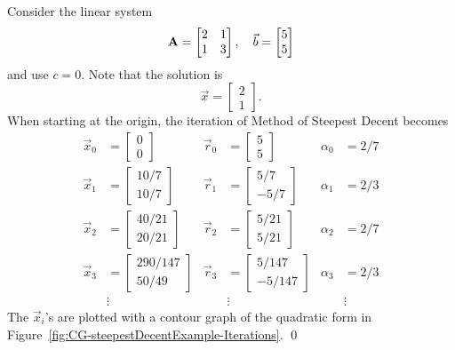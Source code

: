 \begin{example}
\label{ex:CG-SteepestDecent}
Consider the linear system
\[
	\mathbf{A} = \begin{bmatrix}
		2 & 1 \\
		1 & 3
	\end{bmatrix},
	\quad
	\vec{b} = \begin{bmatrix}
		5 \\
		5 
	\end{bmatrix}
\]
and use \(c=0\).
Note that the solution is
\[
	\vec{x} = \begin{bmatrix}
		2 \\ 1
	\end{bmatrix}.
\]
When starting at the origin, the iteration of Method of Steepest Decent becomes
\begin{align*}
	 \vec{x}_0 &= \begin{bmatrix}0\\0\end{bmatrix}
	&\vec{r}_0 &= \begin{bmatrix}5\\5\end{bmatrix}
	&\alpha_0  &= 2/7 \\
	 \vec{x}_1 &= \begin{bmatrix}10/7\\10/7\end{bmatrix}
	&\vec{r}_1 &= \begin{bmatrix}5/7\\-5/7\end{bmatrix}
	&\alpha_1  &= 2/3 \\
	 \vec{x}_2 &= \begin{bmatrix}40/21\\20/21\end{bmatrix}
	&\vec{r}_2 &= \begin{bmatrix}5/21\\5/21\end{bmatrix}
	&\alpha_2  &= 2/7 \\
	 \vec{x}_3 &= \begin{bmatrix}290/147\\50/49\end{bmatrix}
	&\vec{r}_3 &= \begin{bmatrix}5/147\\-5/147\end{bmatrix}
	&\alpha_3  &= 2/3 \\
	&\vdots &&\vdots &&\vdots
\end{align*}
The \(\vec{x}_i\)'s are plotted with a contour graph of the quadratic form in Figure~\ref{fig:CG-steepestDecentExample-Iterations}. \qed

\end{example}


